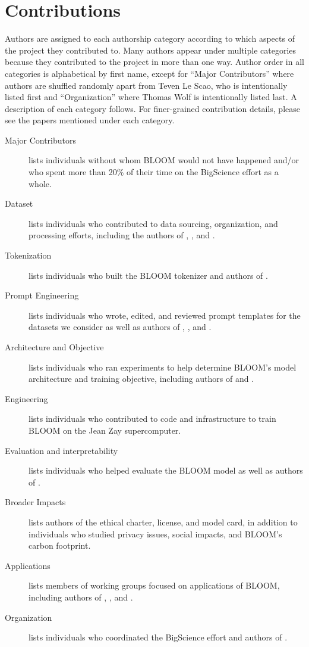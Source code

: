 \section{Contributions}
\label{sec:contributions}

Authors are assigned to each authorship category according to which aspects of the project they contributed to. Many authors appear under multiple categories because they contributed to the project in more than one way. Author order in all categories is alphabetical by first name, except for ``Major Contributors'' where authors are shuffled randomly apart from Teven Le Scao, who is intentionally listed first and ``Organization'' where Thomas Wolf is intentionally listed last. A description of each category follows. For finer-grained contribution details, please see the papers mentioned under each category.

\begin{description}
\item[Major Contributors] lists individuals without whom BLOOM would not have happened and/or who spent more than 20\% of their time on the BigScience effort as a whole.
\item[Dataset] lists individuals who contributed to data sourcing, organization, and processing efforts, including the authors of \citet{laurencon2022bigscience}, \citet{mcmillan-major2022documenting}, and \citet{jernite2022data}.
\item[Tokenization] lists individuals who built the BLOOM tokenizer and authors of \citet{mielke2021between}.
\item[Prompt Engineering] lists individuals who wrote, edited, and reviewed prompt templates for the datasets we consider as well as authors of \citet{sanh2022multitask}, \citet{bach2022promptsource}, and \citet{muennighoff2022crosslingual}.
\item[Architecture and Objective] lists individuals who ran experiments to help determine BLOOM's model architecture and training objective, including authors of \citet{wang2022what} and \citet{scao2022what}.
\item[Engineering] lists individuals who contributed to code and infrastructure to  train BLOOM on the Jean Zay supercomputer.
\item[Evaluation and interpretability] lists individuals who helped evaluate the BLOOM model as well as authors of \citet{talat2022you}.
\item[Broader Impacts] lists authors of the ethical charter, license, and model card, in addition to individuals who studied privacy issues, social impacts, and BLOOM's carbon footprint.
\item[Applications] lists members of working groups focused on applications of BLOOM, including authors of \citet{bigbio}, \citet{fries2022dataset}, and \citet{de-toni-etal-2022-entities}.
\item[Organization] lists individuals who coordinated the BigScience effort and authors of \citet{bigscience2022org}.
\end{description}

